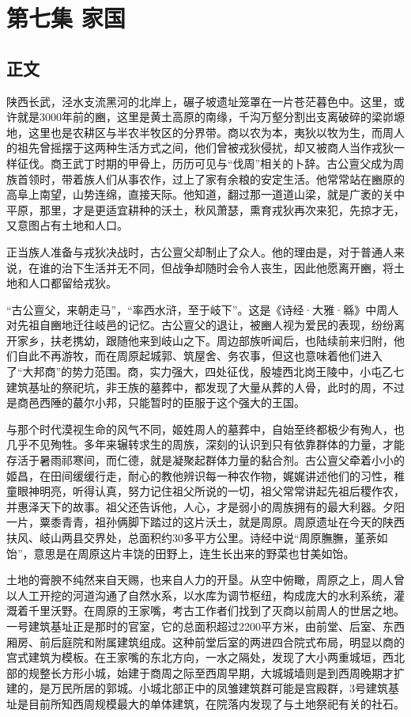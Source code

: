 \chapter{第七集 \quad 家国}

\section{正文}

陕西长武，泾水支流黑河的北岸上，碾子坡遗址笼罩在一片苍茫暮色中。这里，或许就是3000年前的豳，这里是黄土高原的南缘，千沟万壑分割出支离破碎的梁峁塬地，这里也是农耕区与半农半牧区的分界带。商以农为本，夷狄以牧为生，而周人的祖先曾摇摆于这两种生活方式之间，他们曾被戎狄侵扰，却又被商人当作戎狄一样征伐。商王武丁时期的甲骨上，历历可见与“伐周”相关的卜辞。古公亶父成为周族首领时，带着族人们从事农作，过上了家有余粮的安定生活。他常常站在豳原的高阜上南望，山势连绵，直接天际。他知道，翻过那一道道山梁，就是广袤的关中平原，那里，才是更适宜耕种的沃土，秋风萧瑟，熏育戎狄再次来犯，先掠才无，又意图占有土地和人口。

正当族人准备与戎狄决战时，古公亶父却制止了众人。他的理由是，对于普通人来说，在谁的治下生活并无不同，但战争却随时会令人丧生，因此他愿离开豳，将土地和人口都留给戎狄。

“古公亶父，来朝走马”，“率西水浒，至于岐下”。这是《诗经·大雅·緜》中周人对先祖自豳地迁往岐邑的记忆。古公亶父的退让，被豳人视为爱民的表现，纷纷离开家乡，扶老携幼，跟随他来到岐山之下。周边部族听闻后，也陆续前来归附，他们自此不再游牧，而在周原起城郭、筑屋舍、务农事，但这也意味着他们进入了“大邦商”的势力范围。商，实力强大，四处征伐，殷墟西北岗王陵中，小屯乙七建筑基址的祭祀坑，非王族的墓葬中，都发现了大量从葬的人骨，此时的周，不过是商邑西陲的蕞尔小邦，只能暂时的臣服于这个强大的王国。

与那个时代漠视生命的风气不同，姬姓周人的墓葬中，自始至终都极少有殉人，也几乎不见殉牲。多年来辗转求生的周族，深刻的认识到只有依靠群体的力量，才能存活于暑雨祁寒间，而仁德，就是凝聚起群体力量的黏合剂。古公亶父牵着小小的姬昌，在田间缓缓行走，耐心的教他辨识每一种农作物，娓娓讲述他们的习性，稚童眼神明亮，听得认真，努力记住祖父所说的一切，祖父常常讲起先祖后稷作农，并惠泽天下的故事。祖父还告诉他，人心，才是弱小的周族拥有的最大利器。夕阳一片，粟黍青青，祖孙俩脚下踏过的这片沃土，就是周原。周原遗址在今天的陕西扶风、岐山两县交界处，总面积约30多平方公里。诗经中说“周原膴膴，堇荼如饴”，意思是在周原这片丰饶的田野上，连生长出来的野菜也甘美如饴。

土地的膏腴不纯然来自天赐，也来自人力的开垦。从空中俯瞰，周原之上，周人曾以人工开挖的河道沟通了自然水系，以水库为调节枢纽，构成庞大的水利系统，灌溉着千里沃野。在周原的王家嘴，考古工作者们找到了灭商以前周人的世居之地。一号建筑基址正是那时的官室，它的总面积超过2200平方米，由前堂、后室、东西厢房、前后庭院和附属建筑组成。这种前堂后室的两进四合院式布局，明显以商的宫式建筑为模板。在王家嘴的东北方向，一水之隔处，发现了大小两重城垣，西北部的规整长方形小城，始建于商周之际至西周早期，大城城墙则是到西周晚期才扩建的，是万民所居的郭城。小城北部正中的凤雏建筑群可能是宫殿群，3号建筑基址是目前所知西周规模最大的单体建筑，在院落内发现了与土地祭祀有关的社石。

